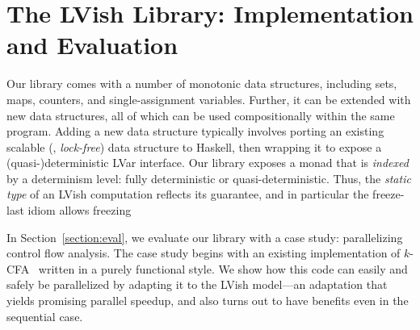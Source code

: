 \chapter{The LVish Library: Implementation and Evaluation\label{ch:lvish}} %





Our library comes with a number of monotonic data structures,
including sets, maps, counters, and single-assignment variables.
Further, it can be extended with new data structures, all of which can
be used compositionally within the same program.  Adding a new data
structure typically involves porting an existing scalable (\eg, {\em
  lock-free}) data structure to Haskell, then wrapping it to expose a
(quasi-)deterministic LVar interface.  Our library exposes a monad
that is \emph{indexed} by a determinism level: fully deterministic or
quasi-deterministic.  Thus, the \emph{static type} of an LVish
computation reflects its guarantee, and in particular the freeze-last
idiom allows freezing
 
In Section~\ref{section:eval}, we evaluate our library with a case
study: parallelizing control flow analysis.  The case study begins
with an existing implementation of $k$-CFA~\cite{MightkCFABlog}
written in a purely functional style.  We show how this code can
easily and safely be parallelized by adapting it to the LVish
model---an adaptation that yields promising parallel speedup, and also
turns out to have benefits even in the sequential case.





